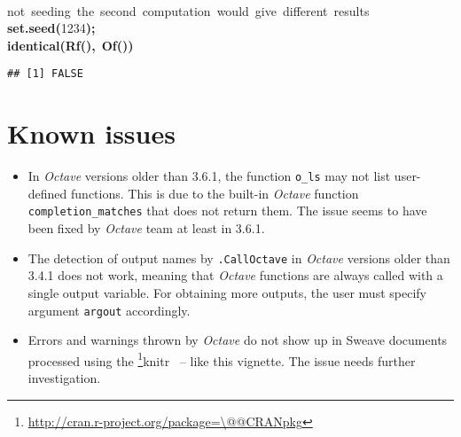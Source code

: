 \documentclass[english,10pt,a4paper]{article}\usepackage{graphicx, color}
\makeatletter
\newcommand{\hlnumber}[1]{\textcolor[rgb]{0,0,0}{#1}}%
\newcommand{\hlfunctioncall}[1]{\textcolor[rgb]{0.501960784313725,0,0.329411764705882}{\textbf{#1}}}%
\newcommand{\hlkeyword}[1]{\textcolor[rgb]{0,0,0}{\textbf{#1}}}%
\newcommand{\hlcomment}[1]{\textcolor[rgb]{0.180392156862745,0.6,0.341176470588235}{#1}}%
\newcommand{\hlstd}[1]{\textcolor[rgb]{0,0,0}{#1}}%
\newenvironment{kframe}{%
 \def\FrameCommand##1{\hskip\@totalleftmargin \hskip-\fboxsep
 \colorbox{shadecolor}{##1}\hskip-\fboxsep
     \hskip-\linewidth \hskip-\@totalleftmargin \hskip\columnwidth}%
 \MakeFramed {\advance\hsize-\width
   \@totalleftmargin\z@ \linewidth\hsize
   \@setminipage}}%
 {\par\unskip\endMakeFramed}
\newenvironment{knitrout}{}{} %
\let\proglang=\textit
\let\code=\texttt
\newcommand{\pkgname}[1]{\textit{#1}\xspace}
\newcommand{\CRANurl}[1]{\url{http://cran.r-project.org/package=#1}}
\def\CRANpkg{\@ifstar\@CRANpkg\@@CRANpkg}
\def\@CRANpkg#1{\href{http://cran.r-project.org/package=#1}{\pkgname{#1}}\footnote{\CRANurl{#1}}}
\def\@@CRANpkg#1{\href{http://cran.r-project.org/package=#1}{\pkgname{#1}} package\footnote{\CRANurl{#1}}}
\newcommand{\citeCRANpkg}[1]{\CRANpkg{#1}~\cite{#1}}
\newcommand{\octave}{\proglang{Octave}\xspace}
\makeatother
\begin{document}
\begin{knitrout}
\begin{kframe}
\begin{flushleft}
\ttfamily\noindent
\hspace*{\fill}\\
\hlstd{}\hlcomment{\usebox{\hlnormalsizeboxhash}{\ }not{\ }seeding{\ }the{\ }second{\ }computation{\ }would{\ }give{\ }different{\ }results}\hspace*{\fill}\\
\hlstd{}\hlfunctioncall{set.seed}\hlkeyword{(}\hlnumber{1234}\hlkeyword{)}\hlkeyword{;}\hspace*{\fill}\\
\hlstd{}\hlfunctioncall{identical}\hlkeyword{(}\hlfunctioncall{Rf}\hlkeyword{(}\hlkeyword{)}\hlkeyword{,}{\ }\hlfunctioncall{Of}\hlkeyword{(}\hlkeyword{)}\hlkeyword{)}\mbox{}
\normalfont
\end{flushleft}
\begin{verbatim}
## [1] FALSE
\end{verbatim}
\end{kframe}
\end{knitrout}


\section{Known issues}
\label{sec:issues}

\begin{itemize}
 \item In \octave versions older than 3.6.1, the function \code{o\_ls} may not
 list user-defined functions. 
 This is due to the built-in \octave function \code{completion\_matches} that
 does not return them. The issue seems to have been fixed by \octave team at
 least in 3.6.1.
 \item The detection of output names by \code{.CallOctave} in \octave versions
 older than 3.4.1 does not work, meaning that \octave functions are always
 called with a single output variable.
 For obtaining more outputs, the user must specify argument \code{argout}
 accordingly.
 \item Errors and warnings thrown by \octave do not show up in Sweave documents
 processed using the \citeCRANpkg{knitr} -- like this vignette.
 The issue needs further investigation.
\end{itemize}
\end{document}
